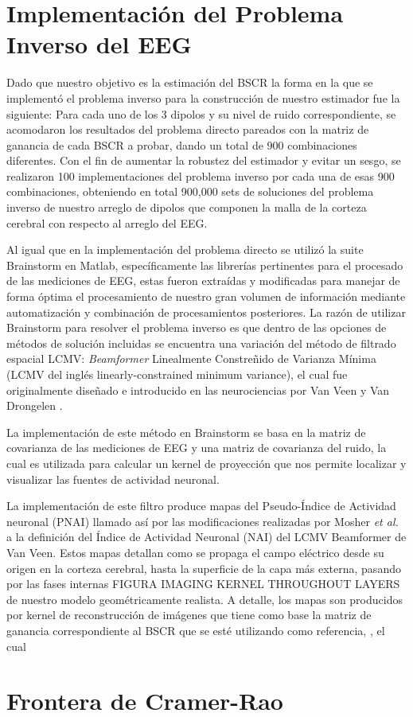 \section{Implementación del Problema Inverso del EEG}
\label{sec:methodology:inverse_solved}

Dado que nuestro objetivo es la estimación del BSCR la forma en la que se implementó el problema inverso para la construcción de nuestro estimador fue la siguiente: Para cada uno de los 3 dipolos y su nivel de ruido correspondiente, se acomodaron los resultados del problema directo pareados con la matriz de ganancia de cada BSCR a probar, dando un total de 900 combinaciones diferentes. Con el fin de aumentar la robustez del estimador y evitar un sesgo, se realizaron 100 implementaciones del problema inverso por cada una de esas 900 combinaciones, obteniendo en total 900,000 sets de soluciones del problema inverso de nuestro arreglo de dipolos que componen la malla de la corteza cerebral con respecto al arreglo del EEG.

Al igual que en la implementación del problema directo se utilizó la suite Brainstorm en Matlab, específicamente las librerías pertinentes para el procesado de las mediciones de EEG, estas fueron extraídas y modificadas para manejar de forma óptima el procesamiento de nuestro gran volumen de información mediante automatización y combinación de procesamientos posteriores. La razón de utilizar Brainstorm para resolver el problema inverso es que dentro de las opciones de métodos de solución incluidas se encuentra una variación del método de filtrado espacial LCMV: \emph{Beamformer} Linealmente Constreñido de Varianza Mínima (LCMV del inglés linearly-constrained minimum variance), el cual fue originalmente diseñado e introducido en las neurociencias por Van Veen y Van Drongelen \cite{VanVeen1988, VanVeen1997}. 

La implementación de este método en Brainstorm se basa en la matriz de covarianza de las mediciones de EEG y una matriz de covarianza del ruido, la cual es utilizada para calcular un kernel de proyección que nos permite localizar y visualizar las fuentes de actividad neuronal.

La implementación de este filtro produce mapas del Pseudo-Índice de Actividad neuronal (PNAI) llamado así por las modificaciones realizadas por Mosher \emph{et al.}\cite{Jaiswal2020} a la definición del Índice de Actividad Neuronal (NAI) del LCMV Beamformer de Van Veen. Estos mapas detallan como se propaga el campo eléctrico desde su origen en la corteza cerebral, hasta la superficie de la capa más externa, pasando por las fases internas FIGURA IMAGING KERNEL THROUGHOUT LAYERS de nuestro modelo geométricamente realista. A detalle, los mapas son producidos por kernel de reconstrucción de imágenes que tiene como base la matriz de ganancia correspondiente al BSCR que se esté utilizando como referencia,  , el cual 



\section{Frontera de Cramer-Rao}
\label{sec:system:conclusion}




